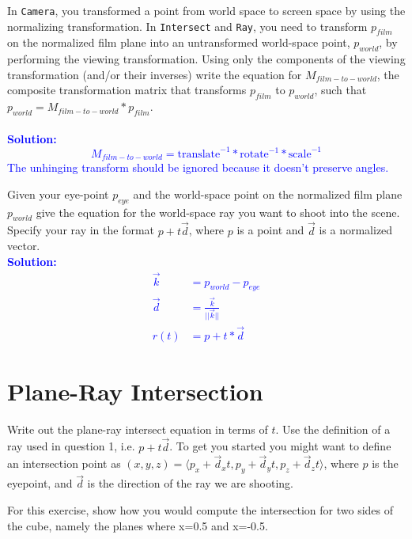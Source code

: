 \documentclass[10pt,twocolumn]{article}
\newcommand{\solution}[1]{\textcolor{Blue}{\\{\bf Solution:} \\ #1}}  %
\begin{document}
\begin{framed}
\noindent {\bf [1 point]} In {\tt Camera}, you transformed a point from world space to screen space by using the normalizing transformation. In {\tt Intersect} and {\tt Ray}, you need to transform $p_{film}$ on the normalized film plane into an untransformed world-space point, $p_{world}$, by performing the viewing transformation. Using only the components of the viewing transformation (and/or their inverses) write the equation for $M_{film-to-world}$, the composite transformation matrix that transforms $p_{film}$ to $p_{world}$, such that $p_{world} = M_{film-to-world} * p_{film}$.\\[5mm]
\solution{
\[M_{film-to-world} = \mbox{translate}^{-1} * \mbox{rotate}^{-1} * \mbox{scale}^{-1}\]
The unhinging transform should be ignored because it doesn't preserve angles.
} 
\end{framed}

\begin{framed}
\noindent {\bf [1 point]} Given your eye-point $p_{eye}$ and the world-space point on the normalized film plane $p_{world}$ give the equation for the world-space ray you want to shoot into the scene. Specify your ray in the format $p + t\vec{d}$, where $p$ is a point and $\vec{d}$ is a normalized vector. 
\solution{
\begin{align*}
\vec{k} &= p_{world} - p_{eye}\\
\vec{d} &= \frac{\vec{k}}{||\vec{k}||} \\
r(t) &= p + t * \vec{d}
\end{align*}
}
\end{framed}

\section{Plane-Ray Intersection}

Write out the plane-ray intersect equation in terms of $t$. Use the definition of a ray used in question 1, i.e. $p + t\vec{d}$. To get you started you might want to define
an intersection point as $(x, y, z) = \langle p_x + \vec{d}_xt, p_y + \vec{d}_yt, p_z + \vec{d}_zt\rangle$, where $p$ is the eyepoint, and $\vec{d}$ is the direction of the ray we are shooting. 

For this exercise, show how you would compute the intersection for two sides of the cube, namely the planes where x=0.5 and x=-0.5.
\end{document}
